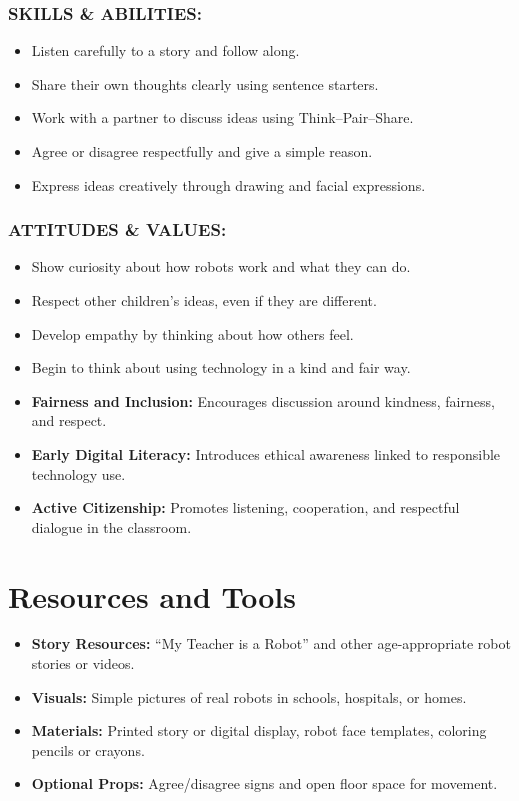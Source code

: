 \documentclass[11pt, a4paper]{article}
\begin{document}
\subsubsection*{SKILLS \& ABILITIES:}
\begin{itemize}
    \item Listen carefully to a story and follow along.
    \item Share their own thoughts clearly using sentence starters.
    \item Work with a partner to discuss ideas using Think--Pair--Share.
    \item Agree or disagree respectfully and give a simple reason.
    \item Express ideas creatively through drawing and facial expressions.
\end{itemize}

\subsubsection*{ATTITUDES \& VALUES:}
\begin{itemize}
    \item Show curiosity about how robots work and what they can do.
    \item Respect other children's ideas, even if they are different.
    \item Develop empathy by thinking about how others feel.
    \item Begin to think about using technology in a kind and fair way.
\end{itemize}

\begin{eurobox}
\begin{itemize}
    \item \textbf{Fairness and Inclusion:} Encourages discussion around kindness, fairness, and respect.
    \item \textbf{Early Digital Literacy:} Introduces ethical awareness linked to responsible technology use.
    \item \textbf{Active Citizenship:} Promotes listening, cooperation, and respectful dialogue in the classroom.
\end{itemize}
\end{eurobox}

\newpage
\section{Resources and Tools}
\begin{itemize}
    \item \textbf{Story Resources:} ``My Teacher is a Robot'' and other age-appropriate robot stories or videos.
    \item \textbf{Visuals:} Simple pictures of real robots in schools, hospitals, or homes.
    \item \textbf{Materials:} Printed story or digital display, robot face templates, coloring pencils or crayons.
    \item \textbf{Optional Props:} Agree/disagree signs and open floor space for movement.
\end{itemize}
\end{document}
